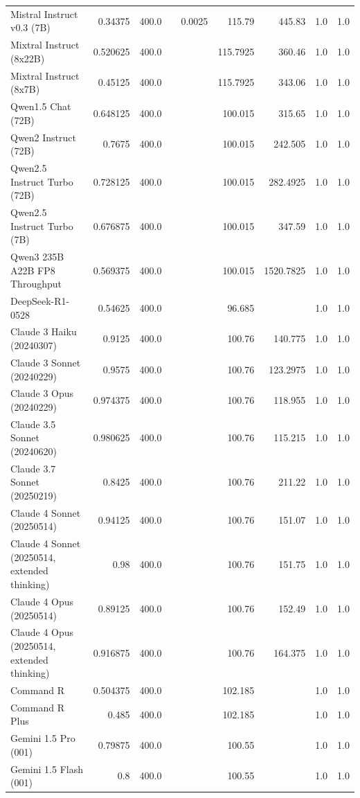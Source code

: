 \begin{table}[htp]
{\begin{tabular}{lrrrrrrrr}
Mistral Instruct v0.3 (7B) & 0.34375 & 400.0 &  & 0.0025 & 115.79 & 445.83 & 1.0 & 1.0 \\
Mixtral Instruct (8x22B) & 0.520625 & 400.0 &  &  & 115.7925 & 360.46 & 1.0 & 1.0 \\
Mixtral Instruct (8x7B) & 0.45125 & 400.0 &  &  & 115.7925 & 343.06 & 1.0 & 1.0 \\
Qwen1.5 Chat (72B) & 0.648125 & 400.0 &  &  & 100.015 & 315.65 & 1.0 & 1.0 \\
Qwen2 Instruct (72B) & 0.7675 & 400.0 &  &  & 100.015 & 242.505 & 1.0 & 1.0 \\
Qwen2.5 Instruct Turbo (72B) & 0.728125 & 400.0 &  &  & 100.015 & 282.4925 & 1.0 & 1.0 \\
Qwen2.5 Instruct Turbo (7B) & 0.676875 & 400.0 &  &  & 100.015 & 347.59 & 1.0 & 1.0 \\
Qwen3 235B A22B FP8 Throughput & 0.569375 & 400.0 &  &  & 100.015 & 1520.7825 & 1.0 & 1.0 \\
DeepSeek-R1-0528 & 0.54625 & 400.0 &  &  & 96.685 &  & 1.0 & 1.0 \\
Claude 3 Haiku (20240307) & 0.9125 & 400.0 &  &  & 100.76 & 140.775 & 1.0 & 1.0 \\
Claude 3 Sonnet (20240229) & 0.9575 & 400.0 &  &  & 100.76 & 123.2975 & 1.0 & 1.0 \\
Claude 3 Opus (20240229) & 0.974375 & 400.0 &  &  & 100.76 & 118.955 & 1.0 & 1.0 \\
Claude 3.5 Sonnet (20240620) & 0.980625 & 400.0 &  &  & 100.76 & 115.215 & 1.0 & 1.0 \\
Claude 3.7 Sonnet (20250219) & 0.8425 & 400.0 &  &  & 100.76 & 211.22 & 1.0 & 1.0 \\
Claude 4 Sonnet (20250514) & 0.94125 & 400.0 &  &  & 100.76 & 151.07 & 1.0 & 1.0 \\
Claude 4 Sonnet (20250514, extended thinking) & 0.98 & 400.0 &  &  & 100.76 & 151.75 & 1.0 & 1.0 \\
Claude 4 Opus (20250514) & 0.89125 & 400.0 &  &  & 100.76 & 152.49 & 1.0 & 1.0 \\
Claude 4 Opus (20250514, extended thinking) & 0.916875 & 400.0 &  &  & 100.76 & 164.375 & 1.0 & 1.0 \\
Command R & 0.504375 & 400.0 &  &  & 102.185 &  & 1.0 & 1.0 \\
Command R Plus & 0.485 & 400.0 &  &  & 102.185 &  & 1.0 & 1.0 \\
Gemini 1.5 Pro (001) & 0.79875 & 400.0 &  &  & 100.55 &  & 1.0 & 1.0 \\
Gemini 1.5 Flash (001) & 0.8 & 400.0 &  &  & 100.55 &  & 1.0 & 1.0 \\

\end{tabular}}
\end{table}
